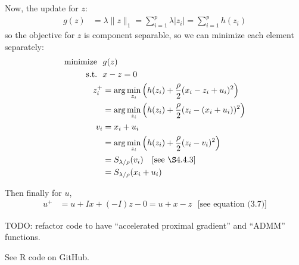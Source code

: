\documentclass{article}
\begin{document}
Now, the update for $z$:
\begin{align*}
g(z)&=\lambda \lVert z\rVert_1=\sum_{i=1}^p \lambda |z_i|=\sum_{i=1}^p h(z_i)
\end{align*}
so the objective for $z$ is component separable, so we can minimize each element separately:
\begin{align*}
\textrm{minimize}~~ &g(z)\\
\textrm{s.t.}~~ & x-z=0\\
z_i^+&=\arg\min_{z_i} \left(h(z_i) + \frac{\rho}{2} (x_i-z_i+u_i)^2 \right)\\
&=\arg\min_{z_i} \left(h(z_i) + \frac{\rho}{2} (z_i-(x_i+u_i))^2 \right)\\
v_i&=x_i+u_i  \\
&=\arg\min_{z_i} \left(h(z_i) + \frac{\rho}{2} (z_i - v_i)^2 \right)\\
&=S_{\lambda/\rho}(v_i)~~~\textrm{[see \S4.4.3]}\\
&=S_{\lambda/\rho}(x_i+u_i)
\end{align*}

Then finally for $u$,
\begin{align*}
u^+&=u+I x + (-I)z-0=u+x-z~~~\textrm{[see equation (3.7)]}
\end{align*}



TODO: refactor code to have ``accelerated proximal gradient'' and ``ADMM'' functions.

See R code on GitHub.



\end{document}
